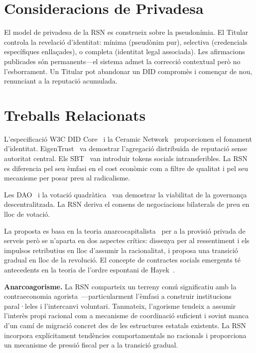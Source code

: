 \documentclass[11pt,a4paper,twocolumn]{article}
\begin{document}
\section{Consideracions de Privadesa}

El model de privadesa de la RSN es construeix sobre la pseudonímia. El Titular controla la revelació d'identitat: mínima (pseudònim pur), selectiva (credencials específiques enllaçades), o completa (identitat legal associada). Les afirmacions publicades són permanents---el sistema admet la correcció contextual però no l'esborrament. Un Titular pot abandonar un DID compromès i començar de nou, renunciant a la reputació acumulada.

\section{Treballs Relacionats}

L'especificació W3C DID Core~\cite{did2022} i la Ceramic Network~\cite{ceramic2023} proporcionen el fonament d'identitat. EigenTrust~\cite{kamvar2003} va demostrar l'agregació distribuïda de reputació sense autoritat central. Els SBT~\cite{weyl2022} van introduir tokens socials intransferibles. La RSN es diferencia pel seu èmfasi en el cost econòmic com a filtre de qualitat i pel seu mecanisme per posar preu al radicalisme.

Les DAO~\cite{buterin2014} i la votació quadràtica~\cite{buterin2019} van demostrar la viabilitat de la governança descentralitzada. La RSN deriva el consens de negociacions bilaterals de preu en lloc de votació.

La proposta es basa en la teoria anarcocapitalista~\cite{rothbard1973,hoppe2001} per a la provisió privada de serveis però se n'aparta en dos aspectes crítics: dissenya per al ressentiment i els impulsos retributius en lloc d'assumir la racionalitat, i proposa una transició gradual en lloc de la revolució. El concepte de contractes socials emergents té antecedents en la teoria de l'ordre espontani de Hayek~\cite{hayek1973}.

\textbf{Anarcoagorisme.} La RSN comparteix un terreny comú significatiu amb la contraeconomia agorista~\cite{konkin2006}---particularment l'èmfasi a construir institucions paral·leles i l'intercanvi voluntari. Tanmateix, l'agorisme tendeix a assumir l'interès propi racional com a mecanisme de coordinació suficient i sovint manca d'un camí de migració concret des de les estructures estatals existents. La RSN incorpora explícitament tendències comportamentals no racionals i proporciona un mecanisme de pressió fiscal per a la transició gradual.
\end{document}
